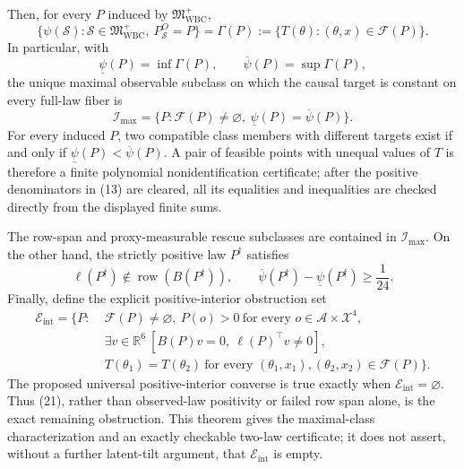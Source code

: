 Then, for every \(P\) induced by \(\mathfrak M_{\mathrm{WBC}}^{+}\),
\[
 \{\psi(\mathcal S):\mathcal S\in\mathfrak M_{\mathrm{WBC}}^{+},\ 
 P_{\mathcal S}^O=P\}
 =\Gamma(P):=\{T(\theta):(\theta,x)\in\mathcal F(P)\}.
 \tag{17}
\]
In particular, with
\[
 \underline\psi(P)=\inf\Gamma(P),\qquad
 \overline\psi(P)=\sup\Gamma(P),
 \tag{18}
\]
the unique maximal observable subclass on which the causal target is constant on
every full-law fiber is
\[
 \mathcal I_{\max}=
 \{P:\mathcal F(P)\ne\varnothing,\ 
       \underline\psi(P)=\overline\psi(P)\}.
 \tag{19}
\]
For every induced \(P\), two compatible class members with different targets
exist if and only if
\(\underline\psi(P)<\overline\psi(P)\).  A pair of feasible points with unequal
values of \(T\) is therefore a finite polynomial nonidentification certificate;
after the positive denominators in (13) are cleared, all its equalities and
inequalities are checked directly from the displayed finite sums.

The row-span and proxy-measurable rescue subclasses are contained in
\(\mathcal I_{\max}\).  On the other hand, the strictly positive law
\(P^{\dagger}\) satisfies
\[
 \ell(P^{\dagger})\notin\operatorname{row}(B(P^{\dagger})),
 \qquad
 \overline\psi(P^{\dagger})-\underline\psi(P^{\dagger})\ge\frac1{24}.
 \tag{20}
\]
Finally, define the explicit positive-interior obstruction set
\[
\begin{aligned}
 \mathcal E_{\mathrm{int}}=\{P:\;&\mathcal F(P)\ne\varnothing,
 \ P(o)>0\ \text{for every }o\in\mathcal A\times\mathcal X^4,\\
 &\exists v\in\mathbb R^6\ [B(P)v=0,\ \ell(P)^\top v\ne0],\\
 &T(\theta_1)=T(\theta_2)\ \text{for every }
   (\theta_1,x_1),(\theta_2,x_2)\in\mathcal F(P)\}.
\end{aligned}
 \tag{21}
\]
The proposed universal positive-interior converse is true exactly when
\(\mathcal E_{\mathrm{int}}=\varnothing\).  Thus (21), rather than observed-law
positivity or failed row span alone, is the exact remaining obstruction.  This
theorem gives the maximal-class characterization and an exactly checkable
two-law certificate; it does not assert, without a further latent-tilt argument,
that \(\mathcal E_{\mathrm{int}}\) is empty.